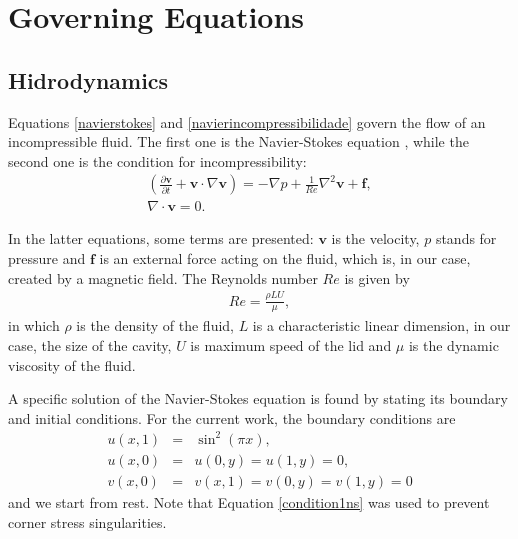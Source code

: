 \documentclass[journal]{IEEEtran}
\begin{document}
\section{Governing Equations}
\subsection{Hidrodynamics}
Equations \ref{navierstokes} and \ref{navierincompressibilidade} govern the flow of an incompressible fluid. The first one is the Navier-Stokes equation \cite{batchelor}, while the second one is the condition for incompressibility: \begin{eqnarray}
\left( \frac{\partial {\textbf{v}}}{\partial t}+\textbf{v}\cdot\nabla \textbf{v} \right)=-\nabla p+\frac{1}{\mathit{Re}}\nabla^2 \textbf{v} + \textbf{f}\label{navierstokes},\\
\nabla\cdot\textbf{v}=0.\label{navierincompressibilidade}
\end{eqnarray}

In the latter equations, some terms are presented: $\mathbf{v}$ is the velocity, $p$ stands for pressure and $\mathbf{f}$ is an external force acting on the fluid, which is, in our case, created by a magnetic field. The Reynolds number $\mathit{Re}$ is given by \begin{eqnarray}
\mathit{Re}=\frac{\rho L U}{\mu},
\end{eqnarray} in which $\rho$ is the density of the fluid, $L$ is a characteristic linear dimension, in our case, the size of the cavity, $U$ is maximum speed of the lid and $\mu$ is the dynamic viscosity of the fluid.



A specific solution of the Navier-Stokes equation is found by stating its boundary and initial conditions. For the current work, the boundary conditions are \begin{eqnarray}
u(x,1) & = & \sin^2(\pi x),\label{condition1ns}\\
u(x,0) & = & u(0,y) = u(1,y) = 0,\label{condition2ns}\\
v(x,0) & = & v(x,1) = v(0, y) = v(1, y) = 0\label{condition3ns}
\end{eqnarray} and we start from rest. Note that Equation \ref{condition1ns} was used to prevent corner stress singularities.
\end{document}
